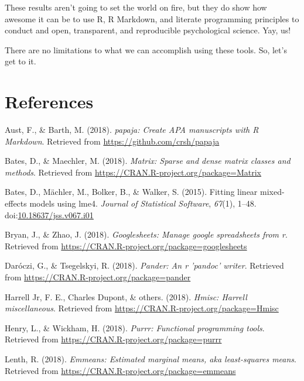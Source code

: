\documentclass[english,man]{apa6}
\theoremstyle{definition}
\theoremstyle{definition}
\theoremstyle{definition}
\theoremstyle{remark}
\begin{document}
These results aren't going to set the world on fire, but they do show
how awesome it can be to use R, R Markdown, and literate programming
principles to conduct and open, transparent, and reproducible
psychological science. Yay, us!

There are no limitations to what we can accomplish using these tools.
So, let's get to it.

\newpage

\section{References}\label{references}

\setlength{\parindent}{-0.5in} \setlength{\leftskip}{0.5in}

\hypertarget{refs}{}
\hypertarget{ref-R-papaja}{}
Aust, F., \& Barth, M. (2018). \emph{papaja: Create APA manuscripts with
R Markdown}. Retrieved from \url{https://github.com/crsh/papaja}

\hypertarget{ref-R-Matrix}{}
Bates, D., \& Maechler, M. (2018). \emph{Matrix: Sparse and dense matrix
classes and methods}. Retrieved from
\url{https://CRAN.R-project.org/package=Matrix}

\hypertarget{ref-R-lme4}{}
Bates, D., Mächler, M., Bolker, B., \& Walker, S. (2015). Fitting linear
mixed-effects models using lme4. \emph{Journal of Statistical Software},
\emph{67}(1), 1--48.
doi:\href{https://doi.org/10.18637/jss.v067.i01}{10.18637/jss.v067.i01}

\hypertarget{ref-R-googlesheets}{}
Bryan, J., \& Zhao, J. (2018). \emph{Googlesheets: Manage google
spreadsheets from r}. Retrieved from
\url{https://CRAN.R-project.org/package=googlesheets}

\hypertarget{ref-R-pander}{}
Daróczi, G., \& Tsegelskyi, R. (2018). \emph{Pander: An r 'pandoc'
writer}. Retrieved from \url{https://CRAN.R-project.org/package=pander}

\hypertarget{ref-R-Hmisc}{}
Harrell Jr, F. E., Charles Dupont, \& others. (2018). \emph{Hmisc:
Harrell miscellaneous}. Retrieved from
\url{https://CRAN.R-project.org/package=Hmisc}

\hypertarget{ref-R-purrr}{}
Henry, L., \& Wickham, H. (2018). \emph{Purrr: Functional programming
tools}. Retrieved from \url{https://CRAN.R-project.org/package=purrr}

\hypertarget{ref-R-emmeans}{}
Lenth, R. (2018). \emph{Emmeans: Estimated marginal means, aka
least-squares means}. Retrieved from
\url{https://CRAN.R-project.org/package=emmeans}
\end{document}
